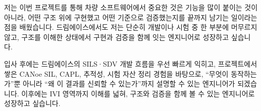 \documentclass[11pt]{article}
\begin{document}
저는 이번 프로젝트를 통해 차량 소프트웨어에서 중요한 것은 기능을 많이 붙이는 것이 아니라, 어떤 구조 위에 구현했고 어떤 기준으로 검증했는지를 끝까지 남기는 일이라는 점을 배웠습니다. 드림에이스에서도 저는 단순히 개발이나 시험 중 한 부분에 머무르지 않고, 구조를 이해한 상태에서 구현과 검증을 함께 잇는 엔지니어로 성장하고 싶습니다.

입사 후에는 드림에이스의 SILS·SDV 개발 흐름을 우선 빠르게 익히고, 프로젝트에서 쌓은 CANoe SIL, CAPL, 추적성, 시험 자산 정리 경험을 바탕으로, ``무엇이 동작하는가''뿐 아니라 ``왜 이 결과를 신뢰할 수 있는가''까지 설명할 수 있는 엔지니어가 되겠습니다. 이후에는 IVI 영역까지 이해를 넓혀, 구조와 검증을 함께 볼 수 있는 엔지니어로 성장하고 싶습니다.
\end{document}
